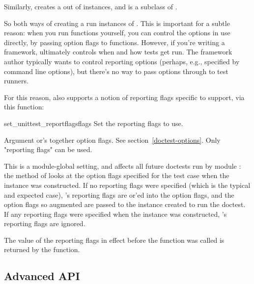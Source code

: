 Similarly,  creates a
 out of 
instances, and  is a subclass of .

So both ways of creating a  run
instances of .  This is important for a subtle reason:
when you run  functions yourself, you can control the
 options in use directly, by passing option flags to
 functions.  However, if you're writing a
 framework,  ultimately controls
when and how tests get run.  The framework author typically wants to
control  reporting options (perhaps, e.g., specified by
command line options), but there's no way to pass options through
 to  test runners.

For this reason,  also supports a notion of
 reporting flags specific to 
support, via this function:

\begin{funcdesc}{set_unittest_reportflags}{flags}
  Set the  reporting flags to use.

  Argument  or's together option flags.  See
  section~\ref{doctest-options}.  Only "reporting flags" can be used.

  This is a module-global setting, and affects all future doctests run by
  module :  the  method of
   looks at the option flags specified for the test case
  when the  instance was constructed.  If no reporting
  flags were specified (which is the typical and expected case),
  's  reporting flags are or'ed into
  the option flags, and the option flags so augmented are passed to the
   instance created to run the doctest.  If any
  reporting flags were specified when the  instance was
  constructed, 's  reporting flags
  are ignored.

  The value of the  reporting flags in effect before the
  function was called is returned by the function.

\end{funcdesc}


\subsection{Advanced API\label{doctest-advanced-api}}

